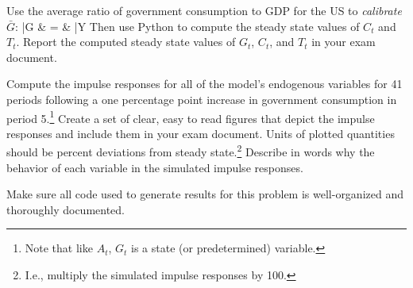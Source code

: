  Use the average ratio of government consumption to GDP for the US to \emph{calibrate} $\bar{G}$:
	\EE
	\bar{G} & = & \bar{Y} \times {}
	\FF
	Then use Python to compute the steady state values of $C_t$ and $T_t$. Report the computed steady state values of $G_t$, $C_t$, and $T_t$ in your exam document.

 Compute the impulse responses for all of the model's endogenous variables for 41 periods following a one percentage point increase in government consumption in period 5.\footnote{Note that like $A_t$, $G_t$ is a state (or predetermined) variable.} Create a set of clear, easy to read figures that depict the impulse responses and include them in your exam document. Units of plotted quantities should be percent deviations from steady state.\footnote{I.e., multiply the simulated impulse responses by 100.} Describe in words why the behavior of each variable in the simulated impulse responses.

 Make sure all code used to generate results for this problem is well-organized and thoroughly documented.
\NE